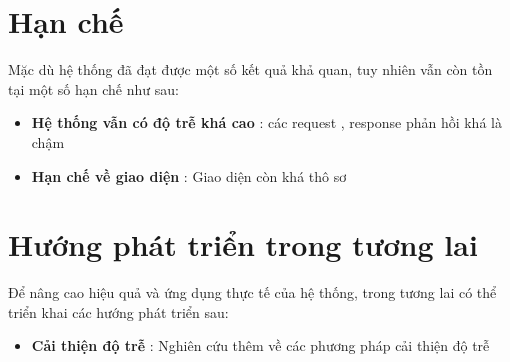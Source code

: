 \section{Hạn chế}

Mặc dù hệ thống đã đạt được một số kết quả khả quan, tuy nhiên vẫn còn tồn tại một số hạn chế như sau:

\begin{itemize}
    \item \textbf{Hệ thống vẫn có độ trễ khá cao} : các request , response phản hồi khá là chậm
    
    \item \textbf{Hạn chế về giao diện} : Giao diện còn khá thô sơ
\end{itemize}

\section{Hướng phát triển trong tương lai}

Để nâng cao hiệu quả và ứng dụng thực tế của hệ thống, trong tương lai có thể triển khai các hướng phát triển sau:

\begin{itemize}
    \item \textbf{Cải thiện độ trễ} :  Nghiên cứu thêm về các phương pháp cải thiện độ trễ

\end{itemize}
